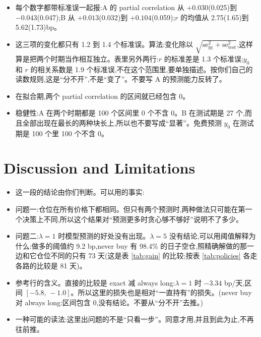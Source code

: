 \documentclass{article}
\newenvironment{pts}{\begin{itemize}[nosep,leftmargin=1.15em,topsep=1pt]}{\end{itemize}}
\begin{document}
\begin{note}
\begin{pts}
\item 每个数字都带标准误一起报:A 的 partial correlation 从 $+0.030$(0.025)到 $-0.043$(0.047);B 从 $+0.013$(0.032)到 $+0.104$(0.059);$r$ 的均值从 2.75(1.65)到 5.62(1.73)bp。
\item 这三项的变化都只有 1.2 到 1.4 个标准误。算法:变化除以 $\sqrt{\mathrm{se}_{\mathrm{fit}}^{2}+\mathrm{se}_{\mathrm{test}}^{2}}$,这样算是把两个时期当作相互独立。表里另外两行:$r$ 的标准差是 1.3 个标准误;$y_0$ 和 $r$ 的相关系数是 1.9 个标准误,不在这个范围里,要单独描述。按你们自己的读数规则,这是``分不开'',不是``变了''。不要写 A 的预测能力反转了。
\item 在拟合期,两个 partial correlation 的区间就已经包含 0。
\item 稳健性:A 在两个时期都是 100 个区间里 0 个不含 0。B 在测试期是 27 个,而且全部出现在最长的两种块长上,所以也不要写成``显著''。免费预测 $y_0$ 在测试期是 100 个里 100 个不含 0。
\end{pts}
\end{note}

\section{Discussion and Limitations}

\begin{note}
\begin{pts}
\item 这一段的结论由你们判断。可以用的事实:
\item 问题一:仓位在所有价格下都相同。但只有两个预测时,两种做法只可能在第一个决策上不同,所以这个结果对``预测更多时贪心够不够好''说明不了多少。
\item 问题二:$\lambda=1$ 时模型预测的好处没有出现。$\lambda=5$ 没有结论,可以用阈值解释为什么:做多的阈值约 9.2 bp,never buy 有 98.4\% 的日子空仓,照精确解做的那一边和它仓位不同的只有 73 天(这是表 \ref{tab:gain} 的比较;按表 \ref{tab:policies} 各走各路的比较是 81 天)。
\item 参考行的含义。直接的比较是 exact 减 always long:$\lambda=1$ 时 $-3.34$ bp/天,区间 $[-5.8,\,-1.0]$。所以这里的损失也是相对``一直持有''的损失。(never buy 对 always long:区间包含 0,没有结论。不要从``分不开''去推。)
\item 一种可能的读法:这里出问题的不是``只看一步''。同意才用,并且到此为止,不再往前推。
\end{pts}
\end{note}
\end{document}
